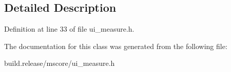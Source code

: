 \subsection{Detailed Description}


Definition at line 33 of file ui\+\_\+measure.\+h.



The documentation for this class was generated from the following file\+:\begin{DoxyCompactItemize}
\item 
build.\+release/mscore/ui\+\_\+measure.\+h\end{DoxyCompactItemize}
